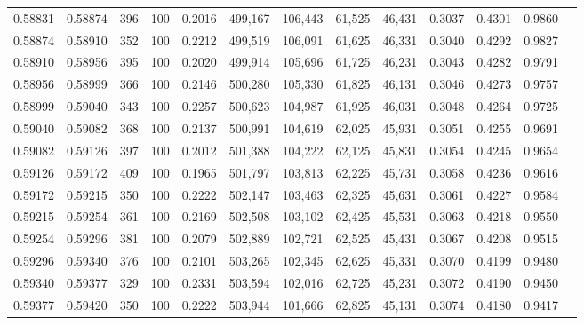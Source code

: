 \begin{tabular}{rrrrrrrrrrrrr}
0.58831 & 0.58874 &   396 & 100 &                                     0.2016 & 499,167 & 106,443 &  61,525 &  46,431 & 0.3037 & 0.4301 & 0.9860 \\
0.58874 & 0.58910 &   352 & 100 &                                     0.2212 & 499,519 & 106,091 &  61,625 &  46,331 & 0.3040 & 0.4292 & 0.9827 \\
0.58910 & 0.58956 &   395 & 100 &                                     0.2020 & 499,914 & 105,696 &  61,725 &  46,231 & 0.3043 & 0.4282 & 0.9791 \\
0.58956 & 0.58999 &   366 & 100 &                                     0.2146 & 500,280 & 105,330 &  61,825 &  46,131 & 0.3046 & 0.4273 & 0.9757 \\
0.58999 & 0.59040 &   343 & 100 &                                     0.2257 & 500,623 & 104,987 &  61,925 &  46,031 & 0.3048 & 0.4264 & 0.9725 \\
0.59040 & 0.59082 &   368 & 100 &                                     0.2137 & 500,991 & 104,619 &  62,025 &  45,931 & 0.3051 & 0.4255 & 0.9691 \\
0.59082 & 0.59126 &   397 & 100 &                                     0.2012 & 501,388 & 104,222 &  62,125 &  45,831 & 0.3054 & 0.4245 & 0.9654 \\
0.59126 & 0.59172 &   409 & 100 &                                     0.1965 & 501,797 & 103,813 &  62,225 &  45,731 & 0.3058 & 0.4236 & 0.9616 \\
0.59172 & 0.59215 &   350 & 100 &                                     0.2222 & 502,147 & 103,463 &  62,325 &  45,631 & 0.3061 & 0.4227 & 0.9584 \\
0.59215 & 0.59254 &   361 & 100 &                                     0.2169 & 502,508 & 103,102 &  62,425 &  45,531 & 0.3063 & 0.4218 & 0.9550 \\
0.59254 & 0.59296 &   381 & 100 &                                     0.2079 & 502,889 & 102,721 &  62,525 &  45,431 & 0.3067 & 0.4208 & 0.9515 \\
0.59296 & 0.59340 &   376 & 100 &                                     0.2101 & 503,265 & 102,345 &  62,625 &  45,331 & 0.3070 & 0.4199 & 0.9480 \\
0.59340 & 0.59377 &   329 & 100 &                                     0.2331 & 503,594 & 102,016 &  62,725 &  45,231 & 0.3072 & 0.4190 & 0.9450 \\
0.59377 & 0.59420 &   350 & 100 &                                     0.2222 & 503,944 & 101,666 &  62,825 &  45,131 & 0.3074 & 0.4180 & 0.9417 \\

\end{tabular}
